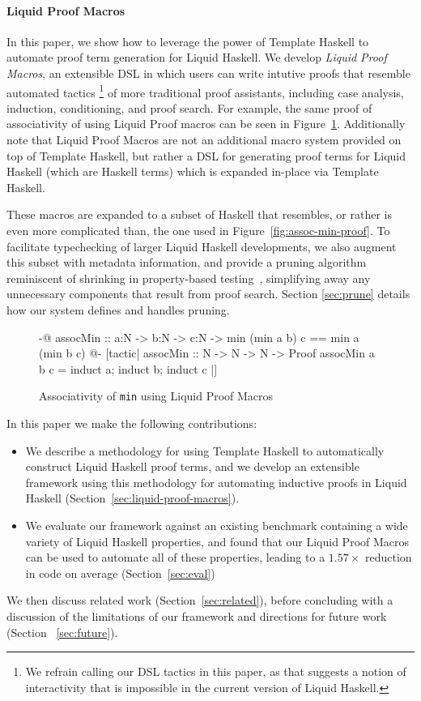 \paragraph*{Liquid Proof Macros}

In this paper, we show how to leverage the power of Template Haskell
to automate proof term generation for Liquid Haskell.  We develop {\em
  Liquid Proof Macros}, an extensible DSL in which users can write
intutive proofs that resemble automated tactics%
\footnote{We refrain calling our DSL tactics in this paper, as that suggests a
  notion of interactivity that is impossible in the current version of Liquid
  Haskell.}%
%
 of more traditional proof assistants, including case analysis,
 induction, conditioning, and proof search. For example, the same
 proof of associativity of  using Liquid Proof macros can be
 seen in Figure~\ref{fig:assoc-min-macro}. Additionally note that Liquid Proof
 Macros are not an additional macro system provided on top of Template Haskell,
 but rather a DSL for generating proof terms for Liquid Haskell (which are
 Haskell terms) which is expanded in-place via Template Haskell.

These macros are expanded to a subset of Haskell that resembles, or
rather is even more complicated than, the one used in
Figure~\ref{fig:assoc-min-proof}. To facilitate typechecking of larger
Liquid Haskell developments, we also augment this subset with metadata
information, and provide a pruning algorithm reminiscent of shrinking
in property-based testing~\cite{ClaessenH00}, simplifying away any
unnecessary components that result from proof search. Section
\ref{sec:prune} details how our system defines and handles pruning.


\begin{figure}[t]
\begin{code}
  {-@ assocMin :: a:N -> b:N -> c:N ->
        {min (min a b) c == min a (min b c)} @-}
  [tactic|
    assocMin :: N -> N -> N -> Proof
    assocMin a b c = induct a; induct b; induct c
  |]
\end{code}
\caption{Associativity of \texttt{min} using Liquid Proof Macros}
\label{fig:assoc-min-macro}
\end{figure}

\pagebreak
In this paper we make the following contributions:
\begin{itemize}
\item We describe a methodology for using Template Haskell to
  automatically construct Liquid Haskell proof terms, and we develop
  an extensible framework using this methodology for automating
  inductive proofs in Liquid Haskell
  (Section~\ref{sec:liquid-proof-macros}).
\item We evaluate our framework against an existing benchmark
  containing a wide variety of Liquid Haskell properties, and found
  that our Liquid Proof Macros can be used to automate all of these
  properties, leading to a $1.57\times$ reduction in code on average
  (Section~\ref{sec:eval})
\end{itemize}
We then discuss related work (Section~\ref{sec:related}), before
concluding with a discussion of the limitations of our framework and
directions for future work (Section ~\ref{sec:future}).

